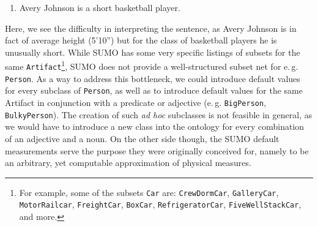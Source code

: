 \documentclass[11pt]{article}
\begin{document}
\begin{enumerate}
    \item Avery Johnson is a short basketball player. \label{ex:avery}
\end{enumerate}

Here, we see the difficulty in interpreting the sentence, as Avery Johnson is in fact of average height (5'10'') but
for the class of basketball players he is unusually short. While SUMO has some very specific listings of subsets for the same \texttt{Artifact}\footnote{For example, some of the subsets \texttt{Car} are: {\tt CrewDormCar}, {\tt GalleryCar}, {\tt MotorRailcar}, {\tt FreightCar}, {\tt BoxCar}, {\tt RefrigeratorCar}, {\tt FiveWellStackCar}, and more.}, %
SUMO does not provide a well-structured subset net for e.\,g. \texttt{Person}.%
As a way to address this bottleneck, we could introduce default values for every subclass of {\tt Person}, as well as to introduce default values for the same Artifact in conjunction with a predicate or adjective (e.\,g. {\tt BigPerson}, {\tt BulkyPerson}). 
The creation of such \emph{ad hoc} subclasses is not feasible in general, as we would have to
introduce a new class into the ontology for every combination of an adjective
and a noun.
 On the other side though, the SUMO default measurements serve the purpose they were originally conceived for, namely to be an arbitrary, yet computable approximation of physical measures.
\end{document}
